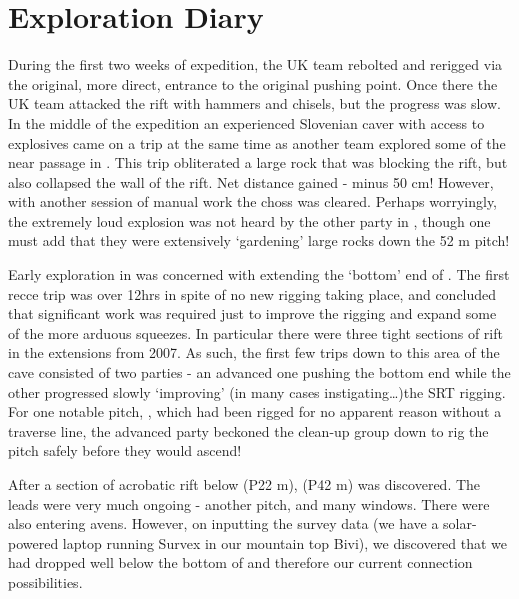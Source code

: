 \section{Exploration Diary}


During the first two weeks of expedition, the UK team rebolted and
rerigged  via the original, more direct, entrance to the
original pushing point. Once there the UK team attacked the rift with
hammers and chisels, but the progress was slow. In the middle of the
expedition an experienced Slovenian caver with access to explosives came
on a trip at the same time as another team explored some of the near
passage in . This trip obliterated a large rock that was
blocking the rift, but also collapsed the wall of the rift. Net distance
gained - minus 50 cm! However, with another session of manual work the
choss was cleared. Perhaps worryingly, the extremely loud explosion was
not heard by the other party in , though one must add
that they were extensively `gardening' large rocks down the 52 m
 pitch!


Early exploration in  was concerned with extending the
`bottom' end of . The first recce trip was over
12hrs in spite of no new rigging taking place, and concluded that
significant work was required just to improve the rigging and expand
some of the more arduous squeezes. In particular there were three tight
sections of rift in the  extensions from 2007. As such,
the first few trips down to this area of the cave consisted of two
parties - an advanced one pushing the bottom end while the other
progressed slowly `improving' (in many cases instigating\ldots{})the
SRT rigging. For one notable pitch, , which had
been rigged for no apparent reason without a traverse line, the advanced
party beckoned the clean-up group down to rig the pitch safely before
they would ascend!

After a section of acrobatic rift below  (P22 m),
 (P42 m) was discovered. The leads were very much
ongoing - another pitch, and many windows. There were also entering
avens. However, on inputting the survey data (we have a solar-powered
laptop running Survex in our mountain top Bivi), we discovered that we
had dropped well below the bottom of  and therefore our current
connection possibilities.


